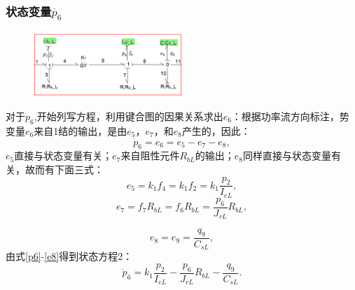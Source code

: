 \subsubsection{状态变量$\dot{ p_6 }$}
\begin{figure}[H]
	\centering
	\includegraphics[width=0.5\textwidth]{fig/equation2.png}
	\caption{}\label{fig:equation2}
\end{figure}
对于$\dot{p} _ { 6 }$,开始列写方程，利用键合图的因果关系求出$e_6$：根据功率流方向标注，势变量$e_6$来自1结的输出，是由$e_5$，$e_7$，和$e_8$产生的，因此：
\begin{equation}\label{p6}
\dot{ p } _ { 6 } = e _ { 6 } = e _ { 5 } - e _ { 7 } - e _ { 8 },
\end{equation}
$e_5$直接与状态变量有关；$e_7$来自阻性元件$R _ { bL }$的输出；$e_8$同样直接与状态变量有关，故而有下面三式：
\begin{equation}
e _ { 5 } = k _ { 1 } f _ { 4 } = k _ { 1 } f _ { 2 } = k _ { 1 } \frac { p _ { 2 } } { I _ { eL }  },
\end{equation}
\begin{equation}
e _ { 7 } = f _ { 7 } R _ { bL }  = f _ { 6 } R _ { b L }  = \frac { p _ { 6 } } { J _ { rL }  } R _ { bL} ,
\end{equation}

\begin{equation}\label{e8}
e _ { 8 } = e _ { 9 } = \frac { q _ { 9 } } { C _ { s L}  } ,
\end{equation}
由式\ref{p6}-\ref{e8}得到状态方程2：
\begin{equation}
\dot{ p } _ { 6 } = k _ { 1 } \frac { p _ { 2 } } { I _ { e L }  } - \frac { p_ { 6 } } { J _ { rL}  } R _ { bL}  - \frac { q _ { 9 } } { C _ { sL }  }.
\end{equation}
